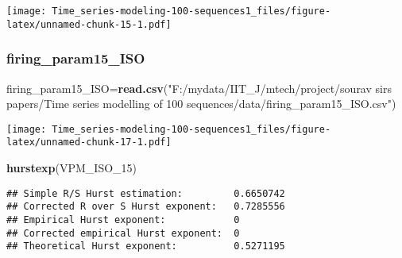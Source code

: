 \documentclass[
]{article}
\newenvironment{Shaded}{\begin{snugshade}}{\end{snugshade}}
\newcommand{\AttributeTok}[1]{\textcolor[rgb]{0.13,0.29,0.53}{#1}}
\newcommand{\DecValTok}[1]{\textcolor[rgb]{0.00,0.00,0.81}{#1}}
\newcommand{\FunctionTok}[1]{\textcolor[rgb]{0.13,0.29,0.53}{\textbf{#1}}}
\newcommand{\NormalTok}[1]{#1}
\newcommand{\OtherTok}[1]{\textcolor[rgb]{0.56,0.35,0.01}{#1}}
\newcommand{\SpecialCharTok}[1]{\textcolor[rgb]{0.81,0.36,0.00}{\textbf{#1}}}
\newcommand{\StringTok}[1]{\textcolor[rgb]{0.31,0.60,0.02}{#1}}
\begin{document}
\texttt{[image: Time\_series-modeling-100-sequences1\_files/figure-latex/unnamed-chunk-15-1.pdf]}

\hypertarget{firing_param15_iso}{%
\subsubsection{firing\_param15\_ISO}\label{firing_param15_iso}}

\begin{Shaded}
\begin{Highlighting}[]
\NormalTok{firing\_param15\_ISO}\OtherTok{=}\FunctionTok{read.csv}\NormalTok{(}\StringTok{"F:/mydata/IIT\_J/mtech/project/sourav sirs papers/Time series modelling of 100 sequences/data/firing\_param15\_ISO.csv"}\NormalTok{)}
\end{Highlighting}
\end{Shaded}

\begin{Shaded}
\end{Shaded}

\texttt{[image: Time\_series-modeling-100-sequences1\_files/figure-latex/unnamed-chunk-17-1.pdf]}

\begin{Shaded}
\begin{Highlighting}[]
\FunctionTok{hurstexp}\NormalTok{(VPM\_ISO\_15)}
\end{Highlighting}
\end{Shaded}

\begin{verbatim}
## Simple R/S Hurst estimation:         0.6650742 
## Corrected R over S Hurst exponent:   0.7285556 
## Empirical Hurst exponent:            0 
## Corrected empirical Hurst exponent:  0 
## Theoretical Hurst exponent:          0.5271195
\end{verbatim}
\end{document}
